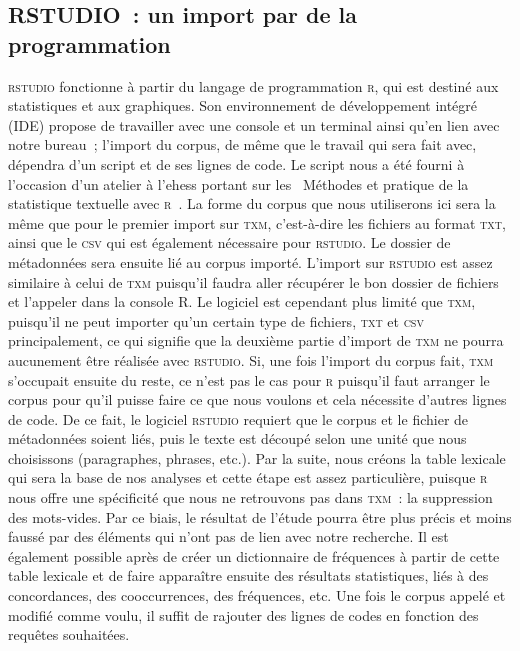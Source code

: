 \subsection{RSTUDIO~: un import par de la programmation}
\textsc{rstudio} fonctionne à partir du langage de programmation \textsc{r}, qui est destiné aux statistiques et aux graphiques. Son environnement de développement intégré (IDE) propose de travailler avec une console et un terminal ainsi qu'en lien avec notre bureau~; l'import du corpus, de même que le travail qui sera fait avec, dépendra d'un script et de ses lignes de code. Le script nous a été fourni à l'occasion d'un atelier à l'\acrshort{ehess} portant sur les \og~Méthodes et pratique de la statistique textuelle avec \textsc{r}~\fg{}. La forme du corpus que nous utiliserons ici sera la même que pour le premier import sur \textsc{txm}, c'est-à-dire les fichiers au format \textsc{txt}, ainsi que le \textsc{csv} qui est également nécessaire pour \textsc{rstudio}. Le dossier de métadonnées sera ensuite lié au corpus importé. L'import sur \textsc{rstudio} est assez similaire à celui de \textsc{txm} puisqu'il faudra aller récupérer le bon dossier de fichiers et l'appeler dans la console R. Le logiciel est cependant plus limité que \textsc{txm}, puisqu'il ne peut importer qu'un certain type de fichiers, \textsc{txt} et \textsc{csv} principalement, ce qui signifie que la deuxième partie d'import de \textsc{txm} ne pourra aucunement être réalisée avec \textsc{rstudio}. Si, une fois l'import du corpus fait, \textsc{txm} s'occupait ensuite du reste, ce n'est pas le cas pour \textsc{r} puisqu'il faut arranger le corpus pour qu'il puisse faire ce que nous voulons et cela nécessite d'autres lignes de code. De ce fait, le logiciel \textsc{rstudio} requiert que le corpus et le fichier de métadonnées soient liés, puis le texte est découpé selon une unité que nous choisissons (paragraphes, phrases, etc.). Par la suite, nous créons la table lexicale qui sera la base de nos analyses et cette étape est assez particulière, puisque \textsc{r} nous offre une spécificité que nous ne retrouvons pas dans \textsc{txm}~: la suppression des mots-vides. Par ce biais, le résultat de l'étude pourra être plus précis et moins faussé par des éléments qui n'ont pas de lien avec notre recherche. Il est également possible après de créer un dictionnaire de fréquences à partir de cette table lexicale et de faire apparaître ensuite des résultats statistiques, liés à des concordances, des cooccurrences, des fréquences, etc. Une fois le corpus appelé et modifié comme voulu, il suffit de rajouter des lignes de codes en fonction des requêtes souhaitées.

